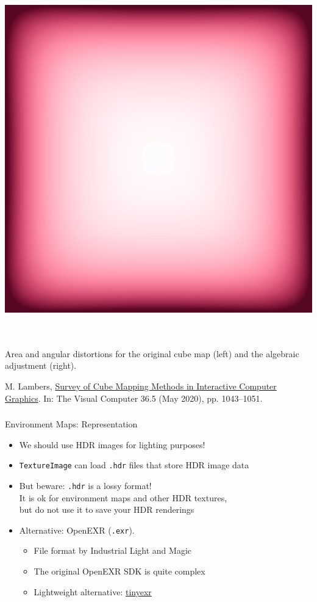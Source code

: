 \documentclass[utf8,stillsansserifmath,fleqn,t]{beamer}
\newcommand{\code}[1]{\texttt{#1}}
\newcommand{\literature}[1]{{\tiny #1 \par}}
\begin{document}
\begin{frame}
\begin{minipage}{.40\textwidth}
\includegraphics[width=.249\textwidth]{./fig/world-cube-algebraic08700-di.png}\\
\end{minipage}\\
~\\[-1ex]
Area and angular distortions for the original cube map (left) and the algebraic
adjustment (right).\\[1ex]

\literature{M. Lambers, \href{https://doi.org/10.1007/s00371-019-01708-4}{Survey of Cube Mapping Methods in Interactive
Computer Graphics}. In: The Visual Computer 36.5 (May 2020), pp. 1043–1051.}
\end{frame}

\begin{frame}
\frametitle{\insertsection}
Environment Maps: Representation
\begin{itemize}
\item We should use HDR images for lighting purposes!\\
\item \code{TextureImage} can load \code{.hdr} files that store HDR image data
\item But beware: \code{.hdr} is a lossy format!\\
    It is ok for environment maps and other HDR textures,\\
    but do not use it to save your HDR renderings\\
\item Alternative: OpenEXR (\code{.exr}).
    \begin{itemize}
    \item File format by Industrial Light and Magic
    \item The original OpenEXR SDK is quite complex
    \item Lightweight alternative: \href{https://github.com/syoyo/tinyexr}{tinyexr}
    \end{itemize}
\end{itemize}
\end{frame}
\end{document}

